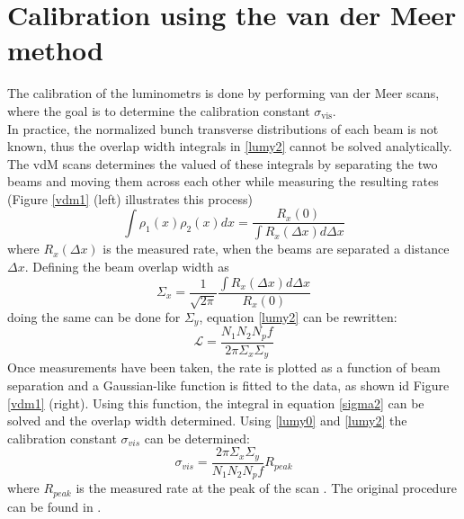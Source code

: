 
\section{Calibration using the van der Meer method }
The calibration of the luminometrs is done by performing van der Meer scans, where the goal is to determine the calibration constant $\sigma_{\text {vis}}$.\\
In practice, the normalized bunch transverse distributions of each beam is not known, thus the overlap width integrals in \ref{lumy2} cannot be solved analytically. The vdM scans determines the valued of these integrals by separating the two beams and moving them across each other while measuring the resulting rates (Figure \ref{vdm1} (left) illustrates this process)
\begin{equation}
    \int \rho_1(x)\rho_{2}(x)dx=\frac{R_{x}(0)}{\int R_{x}(\Delta x)d\Delta x}
\end{equation}
where $R_{x}(\Delta x)$ is the measured rate, when the beams are separated a distance $\Delta x$. Defining the beam overlap  width as
\begin{equation}
\Sigma_{x}=\frac{1}{\sqrt{2\pi}}\frac{\int R_{x}(\Delta x) d\Delta x}{R_{x}(0)}
\label{sigma2}
\end{equation}
doing the same can be done for $\Sigma_{y}$, equation \ref{lumy2} can be rewritten: 
\begin{equation}
    \mathcal{L}=\frac{N_1N_2N_p f}{2\pi\Sigma_x\Sigma_y}
\end{equation}
Once measurements have been taken, the rate is plotted as a function of beam separation and a Gaussian-like function is fitted to the data, as shown id Figure \ref{vdm1} (right). Using this function, the integral in equation \ref{sigma2} can be solved and the overlap width determined. Using \ref{lumy0} and \ref{lumy2} the calibration constant $\sigma_{vis}$ can be determined:
\begin{equation}
    \sigma_{vis}=\frac{2\pi \Sigma_x\Sigma_y}{N_1N_2N_p f} R_{peak}
    \label{sigmavis}
\end{equation}
where $R_{peak}$ is the measured rate at the peak of the scan \cite{CMS-PAS-LUM-18-002}\cite{CMS-PAS-LUM-12-001}. The original procedure can be found in \cite{vanderMeer:296752}.
\newcommand\gauss[2]{1/(#2*sqrt(2*pi))*exp(-((x-#1)^2)/(2*#2^2))} %

